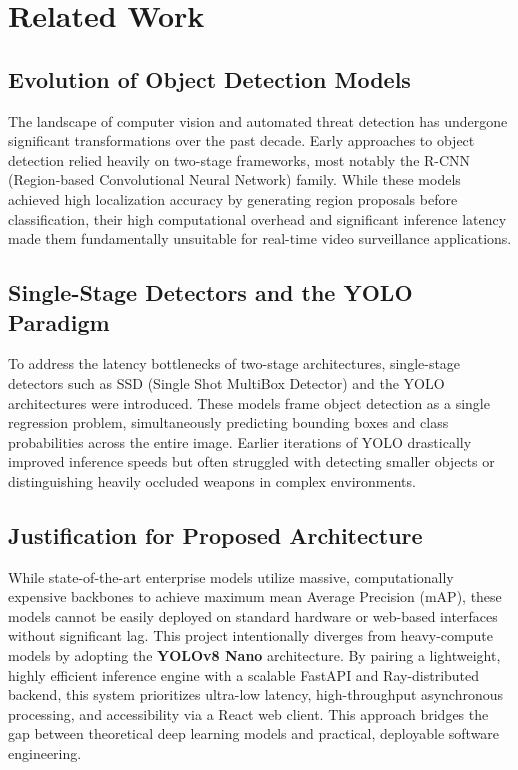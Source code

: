 \documentclass[12pt, a4paper]{report}
\begin{document}
\chapter{Related Work}

\section{Evolution of Object Detection Models}
The landscape of computer vision and automated threat detection has undergone significant transformations over the past decade. Early approaches to object detection relied heavily on two-stage frameworks, most notably the R-CNN (Region-based Convolutional Neural Network) family. While these models achieved high localization accuracy by generating region proposals before classification, their high computational overhead and significant inference latency made them fundamentally unsuitable for real-time video surveillance applications.

\section{Single-Stage Detectors and the YOLO Paradigm}
To address the latency bottlenecks of two-stage architectures, single-stage detectors such as SSD (Single Shot MultiBox Detector) and the YOLO architectures were introduced. These models frame object detection as a single regression problem, simultaneously predicting bounding boxes and class probabilities across the entire image. Earlier iterations of YOLO drastically improved inference speeds but often struggled with detecting smaller objects or distinguishing heavily occluded weapons in complex environments.

\section{Justification for Proposed Architecture}
While state-of-the-art enterprise models utilize massive, computationally expensive backbones to achieve maximum mean Average Precision (mAP), these models cannot be easily deployed on standard hardware or web-based interfaces without significant lag. This project intentionally diverges from heavy-compute models by adopting the \textbf{YOLOv8 Nano} architecture. By pairing a lightweight, highly efficient inference engine with a scalable FastAPI and Ray-distributed backend, this system prioritizes ultra-low latency, high-throughput asynchronous processing, and accessibility via a React web client. This approach bridges the gap between theoretical deep learning models and practical, deployable software engineering.
\end{document}
